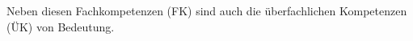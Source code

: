 \documentclass[
11pt,
captions=tableheading,
smallheadings,
headsepline,
footsepline, 
captions=tableheading,
parskip=half-,
]{scrartcl}
\begin{document}
Neben diesen Fachkompetenzen (FK) sind auch die überfachlichen Kompetenzen (ÜK) von Bedeutung.








\end{document}

